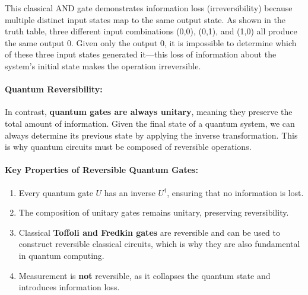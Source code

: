 \noindent This classical AND gate demonstrates information loss
(irreversibility) because multiple distinct input states map to the same
output state. As shown in the truth table, three different input
combinations (0,0), (0,1), and (1,0) all produce the same output 0. Given
only the output 0, it is impossible to determine which of these three input
states generated it—this loss of information about the system's initial
state makes the operation irreversible.

\paragraph{Quantum Reversibility:}
In contrast, \textbf{quantum gates are always unitary}, meaning they
preserve the total amount of information. Given the final state of a
quantum system, we can always determine its previous state by applying the
inverse transformation. This is why quantum circuits must be composed of
reversible operations.


\paragraph{Key Properties of Reversible Quantum Gates:}
\begin{enumerate}
  \item Every quantum gate \( U \) has an inverse \( U^\dagger \), ensuring
    that no information is lost.
  \item The composition of unitary gates remains unitary, preserving
    reversibility.
  \item Classical \textbf{Toffoli and Fredkin gates} are reversible and can
    be used to construct reversible classical circuits, which is why they
    are also fundamental in quantum computing.
  \item Measurement is \textbf{not} reversible, as it collapses the quantum
    state and introduces information loss.
\end{enumerate}

